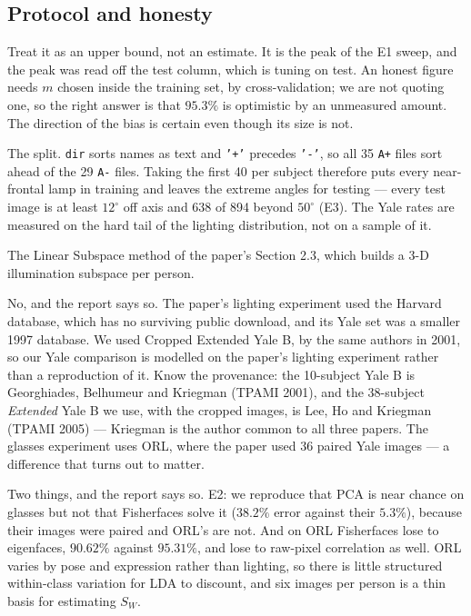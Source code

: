 \documentclass[11pt]{article}
\begin{document}
\subsection{Protocol and honesty}
\begin{description}[style=nextline,leftmargin=0pt]
\item[Is $95.3\%$ your real ORL accuracy?] Treat it as an upper bound, not an
  estimate. It is the peak of the E1 sweep, and the peak was read off the test
  column, which is tuning on test. An honest figure needs $m$ chosen inside the
  training set, by cross-validation; we are not quoting one, so the right answer
  is that $95.3\%$ is optimistic by an unmeasured amount. The direction of the
  bias is certain even though its size is not.
\item[Why are the Yale numbers so low?] The split. \texttt{dir} sorts names as
  text and \texttt{'+'} precedes \texttt{'-'}, so all 35 \texttt{A+} files sort
  ahead of the 29 \texttt{A-} files. Taking the first 40 per subject therefore
  puts every near-frontal lamp in training and leaves the extreme angles for
  testing --- every test image is at least $12^\circ$ off axis and 638 of 894
  beyond $50^\circ$ (E3). The Yale rates are measured on the hard tail of the
  lighting distribution, not on a sample of it.
\item[What did you not implement?] The Linear Subspace method of the paper's
  Section 2.3, which builds a 3-D illumination subspace per person.
\item[Did you use the paper's databases?] No, and the report says so. The
  paper's lighting experiment used the Harvard database, which has no surviving
  public download, and its Yale set was a smaller 1997 database. We used
  Cropped Extended Yale B, by the same authors in 2001, so our Yale comparison
  is modelled on the paper's lighting experiment rather than a reproduction of
  it. Know the provenance: the 10-subject Yale B is Georghiades, Belhumeur and
  Kriegman (TPAMI 2001), and the 38-subject \emph{Extended} Yale B we use, with
  the cropped images, is Lee, Ho and Kriegman (TPAMI 2005) --- Kriegman is the
  author common to all three papers. The glasses experiment uses ORL, where the
  paper used 36 paired Yale images --- a difference that turns out to matter.
\item[Anything that did not come out as the paper says?] Two things, and the
  report says so. E2: we reproduce that PCA is near chance on glasses but not
  that Fisherfaces solve it ($38.2\%$ error against their $5.3\%$), because
  their images were paired and ORL's are not. And on ORL Fisherfaces lose to
  eigenfaces, $90.62\%$ against $95.31\%$,
  and lose to raw-pixel correlation as well. ORL varies by pose and expression
  rather than lighting, so there is little structured within-class variation for
  LDA to discount, and six images per person is a thin basis for estimating
  $S_W$.
\end{description}
\end{document}

